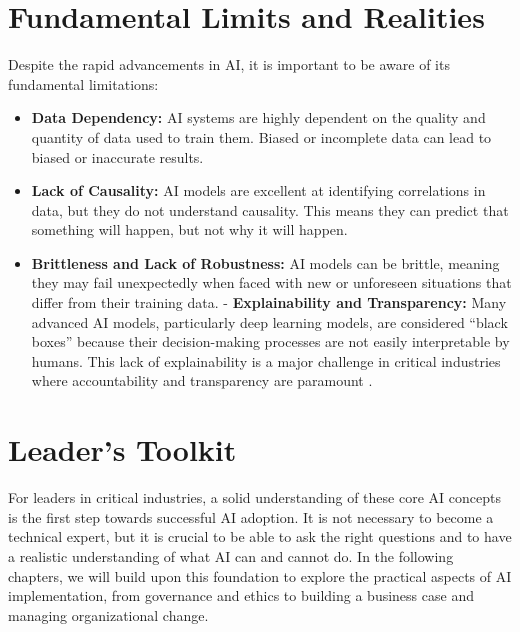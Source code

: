 \section{Fundamental Limits and Realities}
\label{sec:fundamental_limits}
Despite the rapid advancements in AI, it is important to be aware of its fundamental limitations:

\begin{itemize}
    \item \textbf{Data Dependency:} AI systems are highly dependent on the quality and quantity of data used to train them. Biased or incomplete data can lead to biased or inaccurate results.
    \item \textbf{Lack of Causality:} AI models are excellent at identifying correlations in data, but they do not understand causality. This means they can predict that something will happen, but not why it will happen.
    \item \textbf{Brittleness and Lack of Robustness:} AI models can be brittle, meaning they may fail unexpectedly when faced with new or unforeseen situations that differ from their training data.
    - \textbf{Explainability and Transparency:} Many advanced AI models, particularly deep learning models, are considered ``black boxes'' because their decision-making processes are not easily interpretable by humans. This lack of explainability is a major challenge in critical industries where accountability and transparency are paramount \parencite{Adadi2018}.
\end{itemize}

\section{Leader's Toolkit}
\label{sec:core_ai_leaders_toolkit}
For leaders in critical industries, a solid understanding of these core AI concepts is the first step towards successful AI adoption. It is not necessary to become a technical expert, but it is crucial to be able to ask the right questions and to have a realistic understanding of what AI can and cannot do. In the following chapters, we will build upon this foundation to explore the practical aspects of AI implementation, from governance and ethics to building a business case and managing organizational change.
